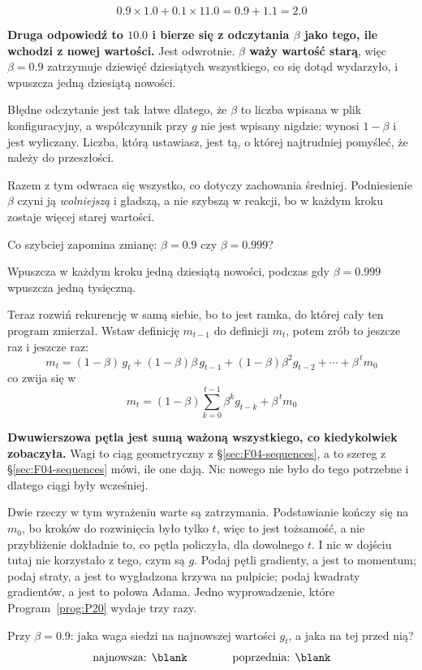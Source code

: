 \begin{fr}
\[ \num{0.9} \times \num{1.0} + \num{0.1} \times \num{11.0}
   = \num{0.9} + \num{1.1} = \num{2.0} \]

\begin{trapbox}
\textbf{Druga odpowiedź to $\num{10.0}$ i bierze się z odczytania $\beta$ jako
tego, ile wchodzi z nowej wartości.} Jest odwrotnie. \textbf{$\beta$ waży
wartość starą}, więc $\beta = \num{0.9}$ zatrzymuje dziewięć dziesiątych
wszystkiego, co się dotąd wydarzyło, i wpuszcza jedną dziesiątą nowości.

Błędne odczytanie jest tak łatwe dlatego, że $\beta$ to liczba wpisana w plik
konfiguracyjny, a współczynnik przy $g$ nie jest wpisany nigdzie: wynosi
$1 - \beta$ i jest wyliczany. Liczba, którą ustawiasz, jest tą, o której
najtrudniej pomyśleć, że należy do przeszłości.

Razem z tym odwraca się wszystko, co dotyczy zachowania średniej. Podniesienie
$\beta$ czyni ją \emph{wolniejszą} i gładszą, a nie szybszą w reakcji, bo w
każdym kroku zostaje więcej starej wartości.
\end{trapbox}

Co szybciej zapomina zmianę: $\beta = \num{0.9}$ czy $\beta = \num{0.999}$?
\nextframe
\end{fr}

\begin{fr}
Wpuszcza w każdym kroku jedną dziesiątą nowości, podczas gdy
$\beta = \num{0.999}$ wpuszcza jedną tysięczną.

Teraz rozwiń rekurencję w samą siebie, bo to jest ramka, do której cały ten
program zmierzał. Wstaw definicję $m_{t-1}$ do definicji $m_t$, potem zrób to
jeszcze raz i jeszcze raz:
\[ m_t = (1-\beta)\,g_t + (1-\beta)\beta\,g_{t-1}
       + (1-\beta)\beta^{2} g_{t-2} + \cdots + \beta^{\,t} m_0 \]
co zwija się w
\[ m_t = (1-\beta)\sum_{k=0}^{t-1} \beta^{k} g_{t-k} + \beta^{\,t} m_0 \]

\textbf{Dwuwierszowa pętla jest sumą ważoną wszystkiego, co kiedykolwiek
zobaczyła.} Wagi to ciąg geometryczny z \S\ref{sec:F04-sequences}, a to szereg
z \S\ref{sec:F04-sequences} mówi, ile one dają. Nic nowego nie było do tego
potrzebne i dlatego ciągi były wcześniej.

Dwie rzeczy w tym wyrażeniu warte są zatrzymania. Podstawianie kończy się na
$m_0$, bo kroków do rozwinięcia było tylko $t$, więc to jest tożsamość, a nie
przybliżenie \dash{} dokładnie to, co pętla policzyła, dla dowolnego $t$. I nic
w dojściu tutaj nie korzystało z tego, czym są $g$. Podaj pętli gradienty, a
jest to momentum; podaj straty, a jest to wygładzona krzywa na pulpicie; podaj
kwadraty gradientów, a jest to połowa Adama. Jedno wyprowadzenie, które
Program~\ref{prog:P20} wydaje trzy razy.

Przy $\beta = \num{0.9}$: jaka waga siedzi na najnowszej wartości $g_t$, a
jaka na tej przed nią?
\[ \text{najnowsza: } \blank \qquad\qquad \text{poprzednia: } \blank \]
\dotline
\nextframe
\end{fr}

